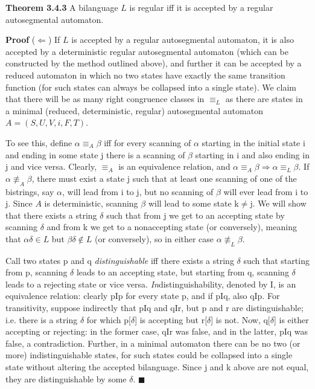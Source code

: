 \smallskip\noindent
{\bf Theorem 3.4.3} A bilanguage $L$ is regular iff it is accepted by a
regular autosegmental automaton.

\smallskip\noindent
{\bf Proof} ($\Leftarrow$) If $L$ is accepted by a regular autosegmental
automaton, it is also accepted by a deterministic regular autosegmental
automaton (which can be constructed by the method outlined above), and further
it can be accepted by a reduced automaton in which no two states have exactly
the same transition function (for such states can always be collapsed into a
single state). We claim that there will be as many right congruence classes in
$\equiv_L$ as there are states in a minimal (reduced, deterministic, regular)
autosegmental automaton $A=(S, U, V, i, F, T)$.

To see this, define $\alpha \equiv_A \beta$ iff for every scanning of $\alpha$
starting in the initial state i and ending in some state j there is a scanning
of $\beta$ starting in i and also ending in j and vice versa.  Clearly,
$\equiv_A$ is an equivalence relation, and $\alpha \equiv_A \beta \Rightarrow
\alpha \equiv_L \beta$. If $\alpha \not\equiv_A \beta$, there must exist a 
state j such that at least one scanning of one of the bistrings, say $\alpha$,
will lead from i to j, but no scanning of $\beta$ will ever lead from i to
j. Since $A$ is deterministic, scanning $\beta$ will lead to some state
k$\neq$j.  We will show that there exists a string $\delta$ such that from j
we get to an accepting state by scanning $\delta$ and from k we get to a
nonaccepting state (or conversely), meaning that $\alpha\delta \in L$ but
$\beta\delta \notin L$ (or conversely), so in either case $\alpha
\not\equiv_L\beta$.

Call two states p and q {\it distinguishable} iff there exists a string
$\delta$ such that starting from p, scanning $\delta$ leads to an accepting
state, but starting from q, scanning $\delta$ leads to a rejecting state or
vice versa. {\it In}distinguishability, denoted by I, is an equivalence
relation: clearly pIp for every state p, and if pIq, also qIp. For
transitivity, suppose indirectly that pIq and qIr, but p and r are
distinguishable; i.e. there is a string $\delta$ for which p[$\delta$] is
accepting but r[$\delta$] is not. Now, q[$\delta$] is either accepting or
rejecting: in the former case, qIr was false, and in the latter, pIq was
false, a contradiction. Further, in a minimal automaton there can be no two
(or more) indistinguishable states, for such states could be collapsed into a
single state without altering the accepted bilanguage. Since j and k above are
not equal, they are distinguishable by some $\delta$. $\blacksquare$

